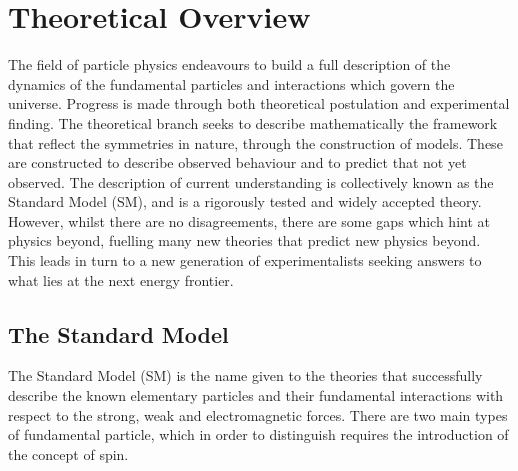 \chapter{Theoretical Overview}
\label{ch:theory}
 
The field of particle physics endeavours to build a full description of the dynamics of the fundamental particles and interactions which govern the universe. Progress is made through both theoretical postulation and experimental finding. The theoretical branch seeks to describe mathematically the framework that reflect the symmetries in nature, through the construction of models. These are constructed to describe observed behaviour and to predict that not yet observed. The description of current understanding is collectively known as the Standard Model (SM), and is a rigorously tested and widely accepted theory. However, whilst there are no disagreements, there are some gaps which hint at physics beyond, fuelling many new theories that predict new physics beyond. This leads in turn to a  new generation of experimentalists seeking answers to what lies at the next energy frontier.

\section{The Standard Model}

The Standard Model (SM) is the name given to the theories that successfully describe the known elementary particles and their fundamental interactions with respect to the strong, weak and electromagnetic forces. There are two main types of fundamental particle, which in order to distinguish requires the introduction of the concept of spin.

